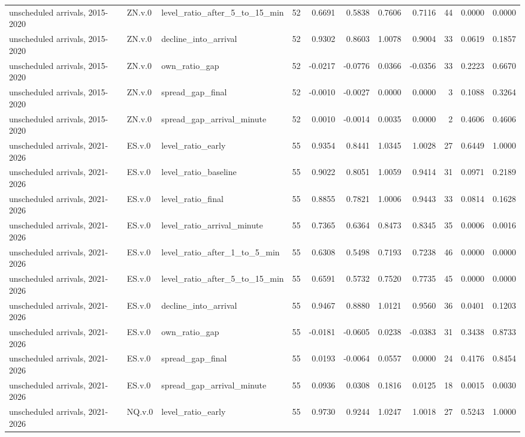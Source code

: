 \begin{tabular}{lllrrrrrrrr}
unscheduled arrivals, 2015-2020 & ZN.v.0 & level_ratio_after_5_to_15_min & 52 & 0.6691 & 0.5838 & 0.7606 & 0.7116 & 44 & 0.0000 & 0.0000 \\
unscheduled arrivals, 2015-2020 & ZN.v.0 & decline_into_arrival & 52 & 0.9302 & 0.8603 & 1.0078 & 0.9004 & 33 & 0.0619 & 0.1857 \\
unscheduled arrivals, 2015-2020 & ZN.v.0 & own_ratio_gap & 52 & -0.0217 & -0.0776 & 0.0366 & -0.0356 & 33 & 0.2223 & 0.6670 \\
unscheduled arrivals, 2015-2020 & ZN.v.0 & spread_gap_final & 52 & -0.0010 & -0.0027 & 0.0000 & 0.0000 & 3 & 0.1088 & 0.3264 \\
unscheduled arrivals, 2015-2020 & ZN.v.0 & spread_gap_arrival_minute & 52 & 0.0010 & -0.0014 & 0.0035 & 0.0000 & 2 & 0.4606 & 0.4606 \\
unscheduled arrivals, 2021-2026 & ES.v.0 & level_ratio_early & 55 & 0.9354 & 0.8441 & 1.0345 & 1.0028 & 27 & 0.6449 & 1.0000 \\
unscheduled arrivals, 2021-2026 & ES.v.0 & level_ratio_baseline & 55 & 0.9022 & 0.8051 & 1.0059 & 0.9414 & 31 & 0.0971 & 0.2189 \\
unscheduled arrivals, 2021-2026 & ES.v.0 & level_ratio_final & 55 & 0.8855 & 0.7821 & 1.0006 & 0.9443 & 33 & 0.0814 & 0.1628 \\
unscheduled arrivals, 2021-2026 & ES.v.0 & level_ratio_arrival_minute & 55 & 0.7365 & 0.6364 & 0.8473 & 0.8345 & 35 & 0.0006 & 0.0016 \\
unscheduled arrivals, 2021-2026 & ES.v.0 & level_ratio_after_1_to_5_min & 55 & 0.6308 & 0.5498 & 0.7193 & 0.7238 & 46 & 0.0000 & 0.0000 \\
unscheduled arrivals, 2021-2026 & ES.v.0 & level_ratio_after_5_to_15_min & 55 & 0.6591 & 0.5732 & 0.7520 & 0.7735 & 45 & 0.0000 & 0.0000 \\
unscheduled arrivals, 2021-2026 & ES.v.0 & decline_into_arrival & 55 & 0.9467 & 0.8880 & 1.0121 & 0.9560 & 36 & 0.0401 & 0.1203 \\
unscheduled arrivals, 2021-2026 & ES.v.0 & own_ratio_gap & 55 & -0.0181 & -0.0605 & 0.0238 & -0.0383 & 31 & 0.3438 & 0.8733 \\
unscheduled arrivals, 2021-2026 & ES.v.0 & spread_gap_final & 55 & 0.0193 & -0.0064 & 0.0557 & 0.0000 & 24 & 0.4176 & 0.8454 \\
unscheduled arrivals, 2021-2026 & ES.v.0 & spread_gap_arrival_minute & 55 & 0.0936 & 0.0308 & 0.1816 & 0.0125 & 18 & 0.0015 & 0.0030 \\
unscheduled arrivals, 2021-2026 & NQ.v.0 & level_ratio_early & 55 & 0.9730 & 0.9244 & 1.0247 & 1.0018 & 27 & 0.5243 & 1.0000 \\

\end{tabular}
